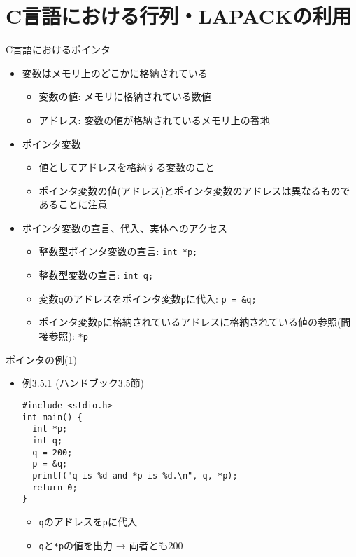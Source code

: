 \section{C言語における行列・LAPACKの利用}

\begin{frame}[t,fragile]{C言語におけるポインタ}
  \begin{itemize}
    \setlength{\itemsep}{1em}
  \item 変数はメモリ上のどこかに格納されている
    \begin{itemize}
    \item 変数の値: メモリに格納されている数値
    \item アドレス: 変数の値が格納されているメモリ上の番地
    \end{itemize}
  \item ポインタ変数
    \begin{itemize}
    \item 値としてアドレスを格納する変数のこと
    \item ポインタ変数の値(アドレス)とポインタ変数のアドレスは異なるものであることに注意
    \end{itemize}
  \item ポインタ変数の宣言、代入、実体へのアクセス
    \begin{itemize}
    \item 整数型ポインタ変数の宣言: {\color{red} \verb+int *p;+}
    \item 整数型変数の宣言: \verb+int q;+
    \item 変数\verb+q+のアドレスをポインタ変数\verb+p+に代入: {\color{red} \verb+p = &q;+}
    \item ポインタ変数\verb+p+に格納されているアドレスに格納されている値の参照(間接参照): {\color{red} \verb+*p+}
    \end{itemize}
  \end{itemize}
\end{frame}

\begin{frame}[t,fragile]{ポインタの例(1)}
  \begin{itemize}
    \setlength{\itemsep}{1em}
  \item 例3.5.1 (ハンドブック3.5節)
\begin{lstlisting}
#include <stdio.h>
int main() {
  int *p;
  int q;
  q = 200;
  p = &q;
  printf("q is %d and *p is %d.\n", q, *p);
  return 0;
}
\end{lstlisting}
\begin{itemize}
\item \verb+q+のアドレスを\verb+p+に代入
\item \verb+q+と\verb+*p+の値を出力 → 両者とも200
\end{itemize}
  \end{itemize}
\end{frame}

